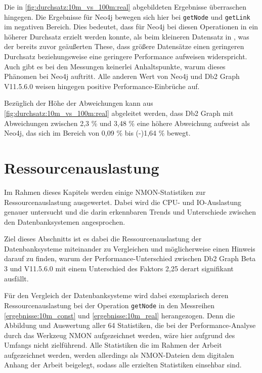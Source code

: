 Die in \autoref{fig:durchsatz:10m_vs_100m:real} abgebildeten Ergebnisse überraschen hingegen. Die Ergebnisse für Neo4j bewegen sich hier bei \texttt{getNode} und \texttt{getLink} im negativen Bereich. Dies bedeutet, dass für Neo4j bei diesen Operationen in  ein höherer Durchsatz erzielt werden konnte, als beim kleineren Datensatz in , was der bereits zuvor geäußerten These, dass größere Datensätze einen geringeren Durchsatz beziehungsweise eine geringere Performance aufweisen widerspricht. Auch gibt es bei den Messungen keinerlei Anhaltspunkte, warum dieses Phänomen bei Neo4j auftritt. Alle anderen Wert von Neo4j und Db2 Graph V11.5.6.0 weisen hingegen positive Performance-Einbrüche auf.

Bezüglich der Höhe der Abweichungen kann aus \autoref{fig:durchsatz:10m_vs_100m:real} abgeleitet werden, dass Db2 Graph mit Abweichungen zwischen 2,3 \% und 3,48 \% eine höhere Abweichung aufweist als Neo4j, das sich im Bereich von 0,09 \% bis (-)1,64 \% bewegt. 

\section{Ressourcenauslastung}
\label{auswertung:ressourcenauslastung}

Im Rahmen dieses Kapitels werden einige NMON-Statistiken zur Ressourcenauslastung ausgewertet. Dabei wird die CPU- und IO-Auslastung genauer untersucht und die darin erkennbaren Trends und Unterschiede zwischen den Datenbanksystemen angesprochen. 

Ziel dieses Abschnitts ist es dabei die Ressourcenauslastung der Datenbanksysteme miteinander zu Vergleichen und möglicherweise einen Hinweis darauf zu finden, warum der Performance-Unterschied zwischen Db2 Graph Beta 3 und V11.5.6.0 mit einem Unterschied des Faktors 2,25 derart signifikant ausfällt. 

Für den Vergleich der Datenbanksysteme wird dabei exemplarisch deren Ressourcenauslastung bei der Operation \texttt{getNode} in den Messreihen \autoref{ergebnisse:10m_const} und \autoref{ergebnisse:10m_real} herangezogen. Denn die Abbildung und Auswertung aller 64 Statistiken, die bei der Performance-Analyse durch das Werkzeug NMON aufgezeichnet werden, wäre hier aufgrund des Umfangs nicht zielführend. Alle Statistiken die im Rahmen der Arbeit aufgezeichnet werden, werden allerdings als NMON-Dateien dem digitalen Anhang der Arbeit beigelegt, sodass alle erzielten Statistiken einsehbar sind.

